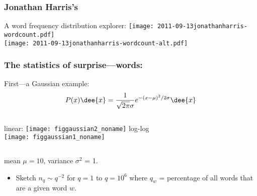 \begin{frame}
\end{frame}

\begin{frame}
  \frametitle{Jonathan Harris's }

  \begin{block}{A word frequency distribution explorer:}
  \texttt{[image: 2011-09-13jonathanharris-wordcount.pdf]}\\
  \smallskip
  \texttt{[image: 2011-09-13jonathanharris-wordcount-alt.pdf]}
  \end{block}
  
\end{frame}


\begin{frame}

  \frametitle{The statistics of surprise---words:}

  \begin{block}{First---a Gaussian example:}
    $$
    P(x) \dee{x} = 
    \frac{1}{\sqrt{2\pi} \sigma}
    e^{-(x-\mu)^2/2\sigma} 
    \dee{x}
    $$
    \begin{columns}
      linear:
      \texttt{[image: figgaussian2\_noname]}
      log-log\\
      \texttt{[image: figgaussian1\_noname]}
    \end{columns}
    mean $\mu=10$, variance $\sigma^2$ = 1.
  \end{block}

  \begin{block}{}
    \begin{itemize}
    \item
      Sketch $n_q \sim q^{-2}$ for $q=1$ to $q=10^6$ 
      where  $q_w$ = percentage of all words that are a given word $w$.
    \end{itemize}
  \end{block}

\end{frame}

